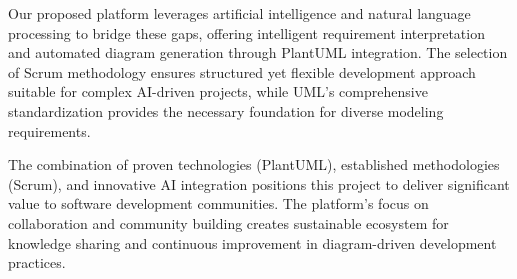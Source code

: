 Our proposed platform leverages artificial intelligence and natural language processing to bridge these gaps, offering intelligent requirement interpretation and automated diagram generation through PlantUML integration. The selection of Scrum methodology ensures structured yet flexible development approach suitable for complex AI-driven projects, while UML's comprehensive standardization provides the necessary foundation for diverse modeling requirements.

The combination of proven technologies (PlantUML), established methodologies (Scrum), and innovative AI integration positions this project to deliver significant value to software development communities. The platform's focus on collaboration and community building creates sustainable ecosystem for knowledge sharing and continuous improvement in diagram-driven development practices.
